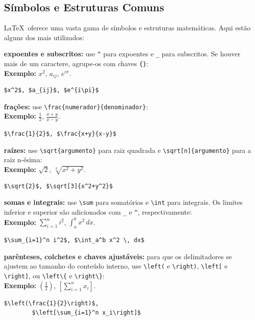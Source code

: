 \subsection{Símbolos e Estruturas Comuns}

\LaTeX\ oferece uma vasta gama de símbolos e estruturas matemáticas. Aqui estão alguns dos mais utilizados:

\begin{alineas}
	\item \textbf{expoentes e subscritos:} use \verb|^| para expoentes e \verb|_| para subscritos. Se houver mais de um caractere, agrupe-os com chaves \verb|{}|:\\
	\textbf{Exemplo:} $x^2$, $a_{ij}$, $e^{i\pi}$.
	\begin{lstlisting}[language={[LaTeX]TeX}]
	$x^2$, $a_{ij}$, $e^{i\pi}$
	\end{lstlisting}
	
	
	\item \textbf{frações:} use \verb|\frac{numerador}{denominador}|:\\
	\textbf{Exemplo:} $\frac{1}{2}$, $\frac{x+y}{x-y}$.
	\begin{lstlisting}[language={[LaTeX]TeX}]
	$\frac{1}{2}$, $\frac{x+y}{x-y}$
	\end{lstlisting}
	
	\item \textbf{raízes:} use \verb|\sqrt{argumento}| para raiz quadrada e \verb|\sqrt[n]{argumento}| para a raiz n-ésima:\\
	\textbf{Exemplo:} $\sqrt{2}$, $\sqrt[3]{x^2+y^2}$.
	\begin{lstlisting}[language={[LaTeX]TeX}]
	$\sqrt{2}$, $\sqrt[3]{x^2+y^2}$
	\end{lstlisting}
	
	\item \textbf{somas e integrais:} use \verb|\sum| para somatórios e \verb|\int| para integrais. Os limites inferior e superior são adicionados com \verb|_| e \verb|^|, respectivamente:\\
	\textbf{Exemplo:} $\sum_{i=1}^n i^2$, $\int_a^b x^2 \, dx$.
	\begin{lstlisting}[language={[LaTeX]TeX}]
	$\sum_{i=1}^n i^2$, $\int_a^b x^2 \, dx$
	\end{lstlisting}
	
	\item \textbf{parênteses, colchetes e chaves ajustáveis:} para que os delimitadores se ajustem ao tamanho do conteúdo interno, use \verb|\left(| e \verb|\right)|, \verb|\left[| e \verb|\right]|, ou \verb|\left\{| e \verb|\right\}|:\\
	\textbf{Exemplo:} $\left(\frac{1}{2}\right)$, $\left[\sum_{i=1}^n x_i\right]$.
	\begin{lstlisting}[language={[LaTeX]TeX}]
	$\left(\frac{1}{2}\right)$,
		$\left[\sum_{i=1}^n x_i\right]$
	\end{lstlisting}
	

\end{alineas}
